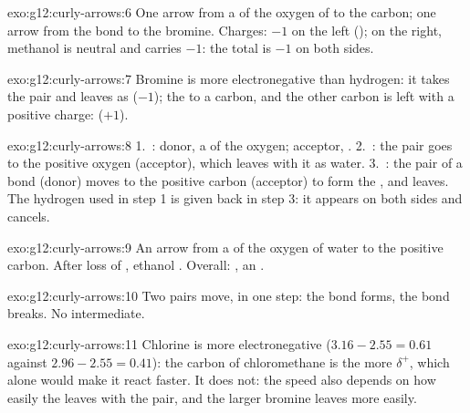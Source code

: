 \begin{solution}{exo:g12:curly-arrows:6}
One arrow from a  of the oxygen of  to the carbon; one
arrow from the  bond to the bromine. Charges: $-1$ on the left
(); on the right, methanol is neutral and  carries $-1$:
the total is $-1$ on both sides.
\end{solution}

\begin{solution}{exo:g12:curly-arrows:7}
Bromine is more electronegative than hydrogen: it takes the pair and
leaves as  ($-1$); the  to a carbon, and the other
carbon is left with a positive charge:  ($+1$).
\end{solution}

\begin{solution}{exo:g12:curly-arrows:8}
1.~: donor, a  of the
oxygen; acceptor, . 2.~: the
 pair goes to the positive oxygen (acceptor), which leaves with
it as water. 3.~: the pair of a  bond
(donor) moves to the positive carbon (acceptor) to form the ,
and  leaves. The hydrogen  used in step 1 is given back in step
3: it appears on both sides and cancels.
\end{solution}

\begin{solution}{exo:g12:curly-arrows:9}
An arrow from a  of the oxygen of water to the positive carbon.
After loss of , ethanol . Overall:
, an .
\end{solution}

\begin{solution}{exo:g12:curly-arrows:10}
Two pairs move, in one step: the  bond forms, the 
bond breaks. No intermediate.
\end{solution}

\begin{solution}{exo:g12:curly-arrows:11}
Chlorine is more electronegative ($3.16 - 2.55 = 0.61$ against
$2.96 - 2.55 = 0.41$): the carbon of chloromethane is the more
$\delta^+$, which alone would make it react faster. It does not: the
speed also depends on how easily the  leaves with the pair, and
the larger bromine leaves more easily.
\end{solution}

